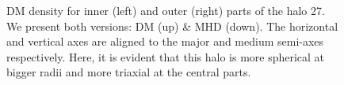 \begin{figure}[!ht]
  \centering
  \hfill
  \hfill
  \hfill
  \caption{DM density for inner (left) and outer (right) parts of the halo 27. We present both versions: DM (up) \& MHD (down). The horizontal and vertical axes are aligned to the major and medium semi-axes respectively. Here, it is evident that this halo is more spherical at bigger radii and more triaxial at the central parts. }
  \label{fig:slices}
\end{figure}

